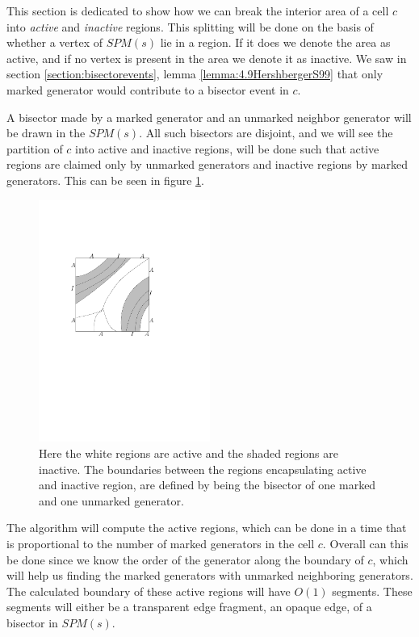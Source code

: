 This section is dedicated to show how we can break the interior area of a cell $c$ into 
\textit{active} and \textit{inactive} regions. This splitting will be done on the basis of 
whether a vertex of $SPM(s)$ lie in a region. If it does we denote the area as active, and if 
no vertex is present in the area we denote it as inactive. We saw in section 
\ref{section:bisectorevents}, lemma \ref{lemma:4.9HershbergerS99} that only marked generator 
would contribute to a bisector event in $c$. 

A bisector made by a marked generator and an unmarked neighbor generator will be drawn in the 
$SPM(s)$. All such bisectors are disjoint, and we will see the partition of $c$ into active 
and inactive regions, will be done such that active regions are claimed only by unmarked 
generators and inactive regions by marked generators. This can be seen in figure 
\ref{fig:activeinactiveregions}. 

\begin{figure}[H]
	\centering
	\includegraphics[width=0.5\textwidth]{figures/activeinactiveregions.pdf}
	\caption{Here the white regions are active and the shaded regions are inactive. The 
    		 boundaries between the regions encapsulating active and inactive region, are 
             defined by being the bisector of one marked and one unmarked generator.}
	\label{fig:activeinactiveregions}
\end{figure}

The algorithm will compute the active regions, which can be done in a time that is proportional to the 
number of marked generators in the cell $c$. Overall can this be done since we know the order of the 
generator along the boundary of $c$, which will help us finding the marked generators with unmarked 
neighboring generators. The calculated boundary of these active regions will have $O(1)$ segments. 
These segments will either be a transparent edge fragment, an opaque edge, of a bisector in $SPM(s)$.

